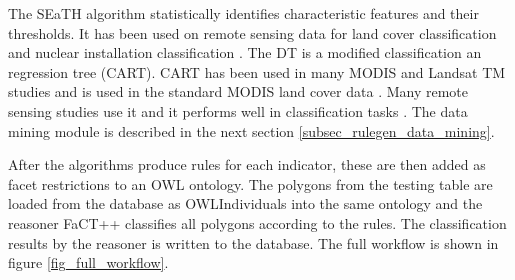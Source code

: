 \documentclass[authoryear, review,12pt,number]{elsarticle}
\begin{document}
The SEaTH algorithm statistically identifies characteristic features and their
thresholds. It has been used on remote sensing data for land cover
classification \citep{Gao2011, Mhangara2013} and nuclear installation
classification \citep{Nussbaum2006}.  The DT is a modified classification an
regression tree (CART)\citep{scikit-learn}. CART has been used in many MODIS and
Landsat TM studies and is used in the standard MODIS land cover data
\citep{friedl2002global}. Many remote sensing studies use it and it performs
well in classification tasks \citep{Li_2014, Qian_2014, Shao_2012}.
The data mining module is described in the next section \ref{subsec_rulegen_data_mining}. 


After the algorithms produce rules for each indicator, these are then added as
facet restrictions to an OWL ontology.  The polygons from the testing table are
loaded from the database as OWLIndividuals into the same ontology and the
reasoner FaCT++ classifies all polygons according to the rules. The
classification results by the reasoner is written to the database. The full
workflow is shown in figure 
\ref{fig_full_workflow}.
\end{document}
